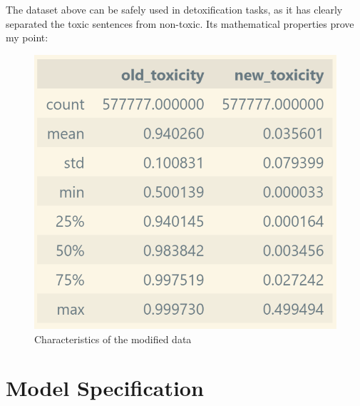 \documentclass[]{article}
\begin{document}
	The dataset above can be safely used in detoxification tasks, as it has clearly separated the toxic sentences from non-toxic. Its mathematical properties prove my point:
	
	\begin{figure}[H]
		\includegraphics[scale=1]{../figures/data2.png}
		\caption{Characteristics of the modified data}
	\end{figure}
	
	\section{Model Specification}
	
\end{document}
